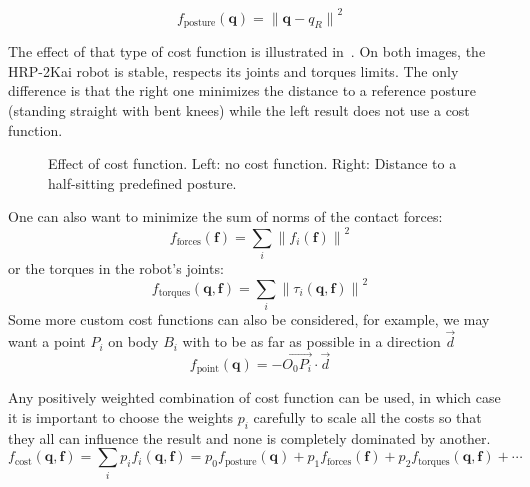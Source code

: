 \begin{equation*}
  f_\text{posture}(\mathbf{q}) = {\|\mathbf{q}-q_R\|}^2
\end{equation*}

The effect of that type of cost function is illustrated in~.
On both images, the HRP-2Kai robot is stable, respects its joints and torques limits.
The only difference is that the right one minimizes the distance to a reference posture (standing straight with bent knees) while the left result does not use a cost function.

\begin{figure}[htpb]
  \centering
  \setlength{\fboxsep}{0pt}%
  \setlength{\fboxrule}{1pt}%
  \caption{Effect of cost function. Left: no cost function. Right: Distance to a half-sitting predefined posture.}
\label{fig:cost}
\end{figure}

One can also want to minimize the sum of norms of the contact forces:
\begin{equation*}
  f_\text{forces}(\mathbf{f}) = \sum\limits_i {\|f_i(\mathbf{f})\|}^2
\end{equation*}
or the torques in the robot's joints:
\begin{equation*}
  f_\text{torques}(\mathbf{q},\mathbf{f}) = \sum\limits_i {\|\tau_i(\mathbf{q},\mathbf{f})\|}^2
\end{equation*}
Some more custom cost functions can also be considered, for example, we may want a point $P_i$ on body $B_i$ with to be as far as possible in a direction $\vec{d}$
\begin{equation*}
  f_\text{point} (\mathbf{q}) = -{\overrightarrow{O_0 P_i}}\cdot{\vec{d}}
\end{equation*}

Any positively weighted combination of cost function can be used, in which case it is important to choose the weights $p_i$ carefully to scale all the costs so that they all can influence the result and none is completely dominated by another.
\begin{equation}
  f_\text{cost}(\mathbf{q},\mathbf{f}) = \sum\limits_i{p_i f_i(\mathbf{q},\mathbf{f})} = p_0 f_\text{posture}(\mathbf{q}) + p_1 f_\text{forces}(\mathbf{f}) + p_2 f_\text{torques}(\mathbf{q},\mathbf{f}) + \cdots
\end{equation}



